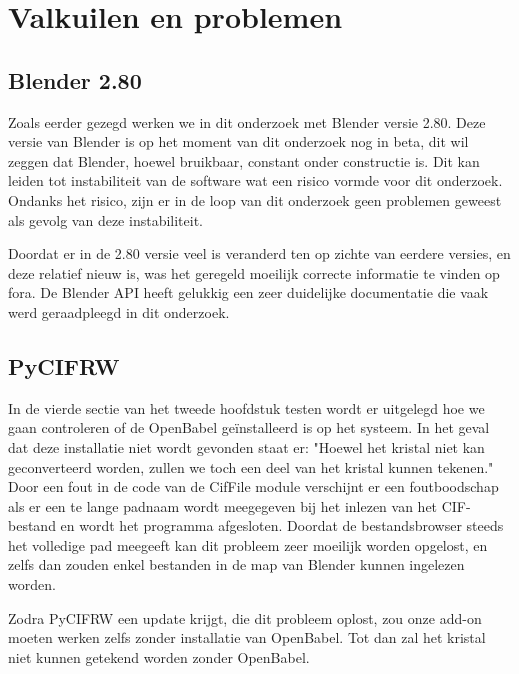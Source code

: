 \section{Valkuilen en problemen}

\subsection{Blender 2.80}
Zoals eerder gezegd werken we in dit onderzoek met Blender versie 2.80. Deze versie van Blender is op het moment van dit onderzoek nog in beta, dit wil zeggen dat Blender, hoewel bruikbaar, constant onder constructie is. Dit kan leiden tot instabiliteit van de software wat een risico vormde voor dit onderzoek. Ondanks het risico, zijn er in de loop van dit onderzoek geen problemen geweest als gevolg van deze instabiliteit.
\par
Doordat er in de 2.80 versie veel is veranderd ten op zichte van eerdere versies, en deze relatief nieuw is, was het geregeld moeilijk correcte informatie te vinden op fora. De Blender API heeft gelukkig een zeer duidelijke documentatie die vaak werd geraadpleegd in dit onderzoek.\citep*{BLEN3} 
\par


\subsection{PyCIFRW}
In de vierde sectie van het tweede hoofdstuk testen wordt er uitgelegd hoe we gaan controleren of de OpenBabel geïnstalleerd is op het systeem. In het geval dat deze installatie niet wordt gevonden staat er: "Hoewel het kristal niet kan geconverteerd worden, zullen we toch een deel van het kristal kunnen tekenen." Door een fout in de code van de CifFile module verschijnt er een foutboodschap als er een te lange padnaam wordt meegegeven bij het inlezen van het CIF-bestand en wordt het programma afgesloten. Doordat de bestandsbrowser steeds het volledige pad meegeeft kan dit probleem zeer moeilijk worden opgelost, en zelfs dan zouden enkel bestanden in de map van Blender kunnen ingelezen worden. 
\par
Zodra PyCIFRW een update krijgt, die dit probleem oplost, zou onze add-on moeten werken zelfs zonder installatie van OpenBabel. Tot dan zal het kristal niet kunnen getekend worden zonder OpenBabel.

